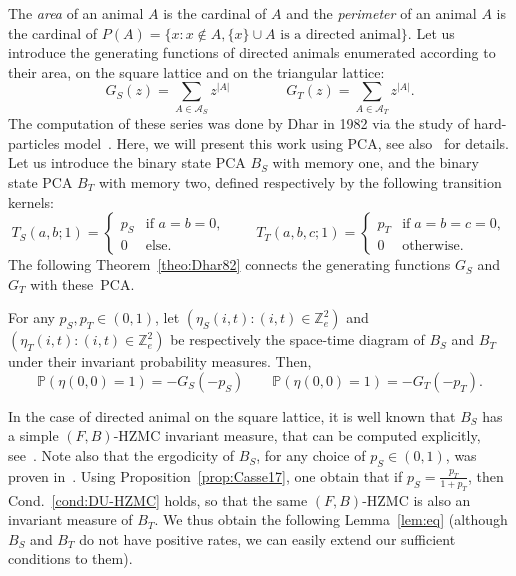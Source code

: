\documentclass[AHL,Unicode,longabstracts]{cedram}
\newcounter{a}
\newcommand{\Cond}{Cond.}
\newcommand{\Z}{\mathbb{Z}}
\newcommand{\Pbb}{\mathbb{P}}
\begin{document}
The \emph{area} of an animal $A$ is the cardinal of $A$ and the \emph{perimeter} of an animal $A$ is the cardinal of $P(A) = \{x : x \notin A, \{x\} \cup A \text{ is a directed animal}\}$. Let us introduce the generating functions of directed animals enumerated according to their area, on the square lattice and on the triangular lattice:
\begin{equation*}
G_S(z) = \sum_{A \in \mathcal{A}_S} z^{|A|} \qquad \qquad G_T(z) = \sum_{A \in \mathcal{A}_T} z^{|A|}.
\end{equation*}
The computation of these series was done by Dhar in 1982 via the study of hard-particles model~\cite{Dhar82}. Here, we will present this work using PCA, see also~\cite{mm_tcs} for details. Let us introduce the binary state PCA $B_S$ with memory one, and the binary state PCA $B_T$ with memory two, defined respectively by the following transition kernels:
\[
T_S(a,b;1) =
\begin{cases}
p_S & \text{if } a=b=0,\\
0 & \text{else}.
\end{cases}
\qquad T_T(a,b,c;1) =
\begin{cases}
p_T & \text{if} \; a=b=c=0,\\
0 & \text{otherwise}.
\end{cases}
\]
The following Theorem~\ref{theo:Dhar82} connects the generating functions $G_S$ and $G_T$ with these~PCA.

\begin{theo} \label{theo:Dhar82}
For any $p_S, p_T\in (0,1)$, let $(\eta_S(i,t): (i,t) \in \Z_{e}^2)$ and $(\eta_T(i,t): (i,t) \in \Z_{e}^2)$ be respectively the space-time diagram of $B_S$ and $B_T$ under their invariant probability measures. Then,
\begin{equation*}
\Pbb\left(\eta(0,0) = 1 \right) = - G_S(-p_S) \qquad \Pbb\left(\eta(0,0) = 1 \right) = - G_T(-p_T).
\end{equation*}
\end{theo}

In the case of directed animal on the square lattice, it is well known that $B_S$ has a simple $(F,B)$-HZMC invariant measure, that can be computed explicitly, see~\cite{BousquetMelou98,CM15,Dhar82,LBM07}. Note also that the ergodicity of $B_S$, for any choice of $p_S\in(0,1)$, was proven in~\cite{hmm}. Using Proposition~\ref{prop:Casse17}, one obtain that if $ p_S = \frac{p_T}{1+p_T}$, then \Cond~\ref{cond:DU-HZMC} holds, so that the same $(F,B)$-HZMC is also an invariant measure of $B_T$. We thus obtain the following Lemma~\ref{lem:eq} (although $B_S$ and $B_T$ do not have positive rates, we can easily extend our sufficient conditions to them).
\end{document}
